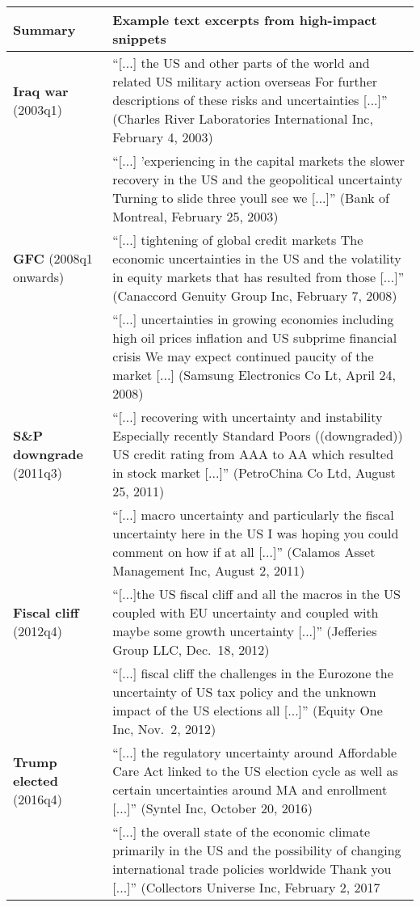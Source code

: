 \documentclass[12pt,oneside,leqno]{article}
\begin{document}
\begin{minipage}[t]{.9\textwidth}
\footnotesize
\begin{tabular}{p{}p{}}
\toprule
Summary & Example text excerpts from high-impact snippets \\\midrule
\textbf{Iraq war} \newline (2003q1) & ``[...] the US and other parts of the world and related {US} military action overseas For further descriptions of these {risks} and {uncertainties} [...]'' (Charles River Laboratories International Inc, February 4, 2003) \\
& ``[...] 'experiencing in the capital markets the slower recovery in the {US} and the geopolitical {uncertainty} Turning to slide three youll see we [...]'' (Bank of Montreal, February 25, 2003) \\\addlinespace
\textbf{GFC} (2008q1 onwards) & ``[...] tightening of global credit markets The economic {uncertainties} in the {US} and the volatility in equity markets that has resulted from those [...]'' (Canaccord Genuity Group Inc, February 7, 2008) \\
& ``[...] {uncertainties} in growing economies including high oil prices inflation and {US} subprime financial crisis We may expect continued paucity of the market [...] (Samsung Electronics Co Lt, April 24, 2008) \\\addlinespace
\textbf{S\&P downgrade} (2011q3) & ``[...] recovering with {uncertainty} and {instability} Especially recently Standard Poors ((downgraded)) {US} credit rating from AAA to AA which resulted in stock market [...]'' (PetroChina Co Ltd, August 25, 2011) \\
& ``[...] macro {uncertainty} and particularly the fiscal {uncertainty} here in the {US} I was hoping you could comment on how if at all [...]'' (Calamos Asset Management Inc, August 2, 2011) \\\addlinespace
\textbf{Fiscal cliff} \newline (2012q4) & ``[...]the US fiscal cliff and all the macros in the {US} coupled with EU {uncertainty} and coupled with maybe some growth {uncertainty} [...]'' (Jefferies Group LLC, Dec.\ 18, 2012) \\
& ``[...] fiscal cliff the challenges in the Eurozone the {uncertainty} of {US} tax policy and the {unknown} impact of the US elections all [...]'' (Equity One Inc, Nov.\ 2, 2012) \\\addlinespace
\textbf{Trump elected} (2016q4) & ``[...] the regulatory {uncertainty} around Affordable Care Act linked to the {US} election cycle as well as certain {uncertainties} around MA and enrollment [...]'' (Syntel Inc, October 20, 2016) \\
& ``[...] the overall state of the economic climate primarily in the {US} and the {possibility} of changing international trade policies worldwide Thank you [...]'' (Collectors Universe Inc, February 2, 2017 \\\bottomrule
\end{tabular}
\end{minipage}
\end{document}

